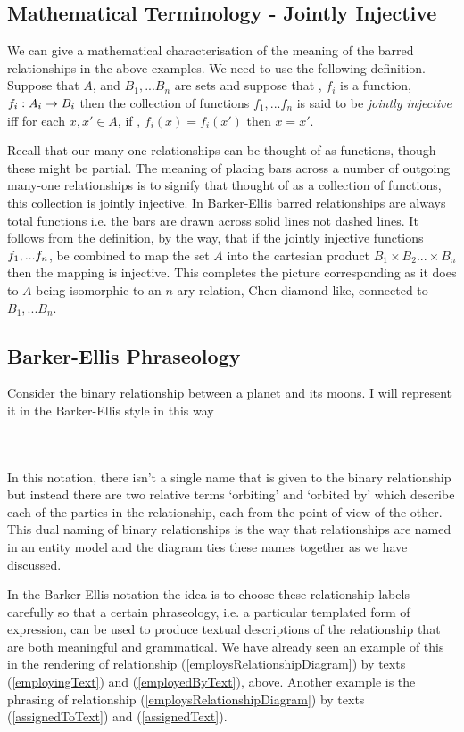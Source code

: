 \subsection{Mathematical Terminology - Jointly Injective}
\label{JointlyInjective}
\mynote
We can give a mathematical characterisation of the meaning of the barred relationships in the above examples.
We need to use the following definition.
Suppose that $A$, and $B_1,...B_n$ are sets and suppose that \foreachi, $f_i$ is a function, $f_i:A_i \rightarrow B_i$ 
then the collection of functions $f_1,...f_n$ is said to be \textit{jointly injective}
iff for each $x,x' \in A$, if \foreachi, $f_i(x)=f_i(x')$ then $x=x'$.

Recall that our many-one relationships can be thought of as functions, though these might be partial.
The meaning of placing bars across a number of outgoing many-one relationships is to signify that thought of as a collection of functions, this collection is jointly injective. In Barker-Ellis barred relationships are always total functions i.e. the bars are drawn across solid lines not dashed lines.
\mynote
It follows from the definition, by the way, that if the jointly injective functions $f_1,...f_n$, be combined
to map the set $A$ into the cartesian product $B_1 \times B_2 ... \times B_n$
then the mapping is injective. This completes the picture corresponding as it does to $A$ being isomorphic to an $n$-ary relation,
Chen-diamond like, connected to $B_1,...B_n$.


\subsection{Barker-Ellis Phraseology} 
\mynote 
Consider the binary relationship between a  planet and its moons.
I will represent it in the  Barker-Ellis style in this way
\begin{gather}
\label{planetMoon}
\raisebox{-0.65cm}{

}
\end{gather}
In this notation, there isn't a single name that is given to
 the binary relationship but instead there are two relative terms `orbiting' and `orbited by' which describe each of the parties in the relationship, each from the point of view of the other. This dual naming of binary relationships is the way that relationships are named in an entity model and the diagram ties these names together as we have discussed.

\mynote
In the Barker-Ellis notation the idea 
is to choose these relationship labels
carefully so that a certain phraseology, i.e. a particular templated form of expression,
can be used to produce textual descriptions of the relationship that are both meaningful and grammatical.
We have already seen an example of this in the rendering of
relationship (\ref{employsRelationshipDiagram}) by texts 
(\ref{employingText}) and (\ref{employedByText}), above. 
Another example is the phrasing of relationship (\ref{employsRelationshipDiagram})
by texts (\ref{assignedToText}) and (\ref{assignedText}).  

